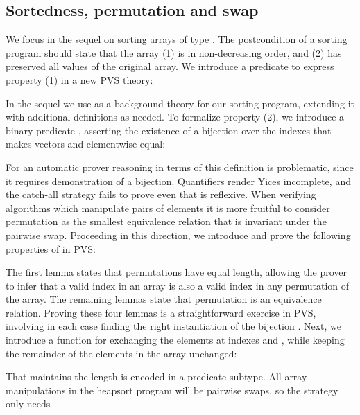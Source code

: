 \documentclass[english,submission]{eptcs}
\begin{document}
\subsection{Sortedness, permutation and swap}

We focus in the sequel on sorting arrays of type .
The postcondition of a sorting program should state that the array
(1) is in non-decreasing order, and (2) has preserved all values of
the original array. We introduce a predicate  to
express property (1) in a new PVS theory:
\begin{quote}

\end{quote}
\noindent In the sequel we use  as a background
theory for our sorting program, extending it with additional definitions
as needed. To formalize property (2), we introduce a binary predicate
, asserting the existence of a bijection over the
indexes that makes vectors  and  elementwise
equal:
\begin{quote}

\end{quote}
\noindent For an automatic prover reasoning in terms of this definition
is problematic, since it requires demonstration of a bijection. Quantifiers
render Yices incomplete, and the catch-all strategy 
fails to prove even that  is reflexive. When verifying
algorithms which manipulate pairs of elements it is more fruitful
to consider permutation as the smallest equivalence relation that
is invariant under the pairwise swap. Proceeding in this direction,
we introduce and prove the following properties of 
in PVS:
\begin{quote}
\noindent 
\end{quote}
\noindent The first lemma states that permutations have equal length,
allowing the prover to infer that a valid index in an array is also
a valid index in any permutation of the array. The remaining lemmas
state that permutation is an equivalence relation. Proving these four
lemmas is a straightforward exercise in PVS, involving in each case
finding the right instantiation of the bijection . Next,
we introduce a function  for exchanging the elements
at indexes  and , while keeping the remainder
of the elements in the array unchanged:
\begin{quote}

\end{quote}
\noindent That  maintains the length is encoded in
a predicate subtype. All array manipulations in the heapsort program
will be pairwise swaps, so the  strategy only needs
\end{document}
